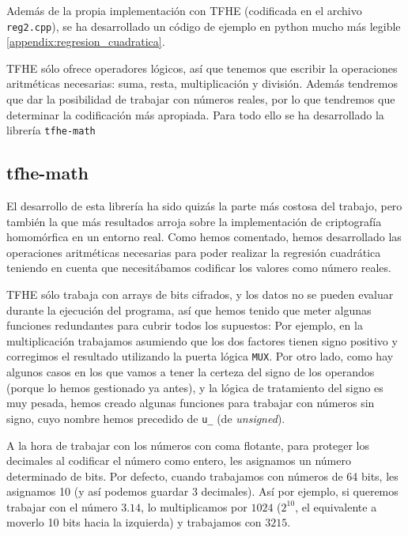 Además de la propia implementación con TFHE (codificada en el archivo \verb|reg2.cpp|), se ha desarrollado un código de ejemplo en python mucho más legible \ref{appendix:regresion_cuadratica}.

TFHE sólo ofrece operadores lógicos, así que tenemos que escribir la operaciones aritméticas necesarias: suma, resta, multiplicación y división. Además tendremos que dar la posibilidad de trabajar con números reales, por lo que tendremos que determinar la codificación más apropiada. Para todo ello se ha desarrollado la librería \texttt{tfhe-math}

\subsection{tfhe-math}

El desarrollo de esta librería ha sido quizás la parte más costosa del trabajo, pero también la que más resultados arroja sobre la implementación de criptografía homomórfica en un entorno real. Como hemos comentado, hemos desarrollado las operaciones aritméticas necesarias para poder realizar la regresión cuadrática teniendo en cuenta que necesitábamos codificar los valores como número reales.

TFHE sólo trabaja con arrays de bits cifrados, y los datos no se pueden evaluar durante la ejecución del programa, así que hemos tenido que meter algunas funciones redundantes para cubrir todos los supuestos: Por ejemplo, en la multiplicación trabajamos asumiendo que los dos factores tienen signo positivo y corregimos el resultado utilizando la puerta lógica \texttt{MUX}. Por otro lado, como hay algunos casos en los que vamos a tener la certeza del signo de los operandos (porque lo hemos gestionado ya antes), y la lógica de tratamiento del signo es muy pesada, hemos creado algunas funciones para trabajar con números sin signo, cuyo nombre hemos precedido de \texttt{u\_} (de \textit{unsigned}).

A la hora de trabajar con los números con coma flotante, para proteger los decimales al codificar el número como entero, les asignamos un número determinado de bits. Por defecto, cuando trabajamos con números de 64 bits, les asignamos 10 (y así podemos guardar 3 decimales). Así por ejemplo, si queremos trabajar con el número $ 3.14 $, lo multiplicamos por $ 1024 $ ($ 2^{10} $, el equivalente a moverlo 10 bits hacia la izquierda) y trabajamos con $ 3215 $.


